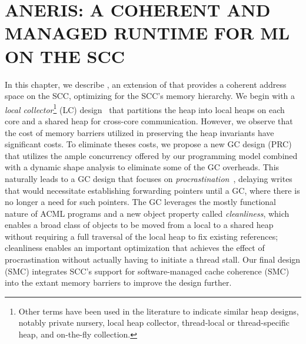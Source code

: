 \newcommand{\lc}{LC\xspace}
\newcommand{\prc}{PRC\xspace}
\newcommand{\smc}{SMC\xspace}
\newcommand{\kcore}{k_{core}}
\newcommand{\kmesh}{k_{mesh}}
\newcommand{\kram}{k_{ram}}

\lstset{
language=C,
numbers=left,
numberstyle=\footnotesize,
frame=single}




\chapter{ANERIS: A COHERENT AND MANAGED RUNTIME FOR ML ON THE SCC}
\label{chap:aneris}

In this chapter, we describe \MMSCC, an extension of \MM that provides a
coherent address space on the SCC, optimizing for the SCC's memory hierarchy.
We begin with a \emph{local collector}\footnote{Other terms have been used in
the literature to indicate similar heap designs, notably private nursery, local
heap collector, thread-local or thread-specific heap, and on-the-fly
collection.} (\lc) design~\cite{Steele75, Doligez93, Steensgaard00, Anderson10,
Marlow11, Auhagen11} that partitions the heap into local heaps on each core and
a shared heap for cross-core communication. However, we observe that the cost
of memory barriers utilized in preserving the heap invariants have significant
costs. To eliminate theses costs, we propose a new GC design (\prc) that
utilizes the ample concurrency offered by our programming model combined with a
dynamic shape analysis to eliminate some of the GC overheads. This naturally
leads to a GC design that focuses on \emph{procrastination}~\cite{mmgc},
delaying writes that would necessitate establishing forwarding pointers until a
GC, where there is no longer a need for such pointers. The GC leverages the
mostly functional nature of ACML programs and a new object property called
\emph{cleanliness}, which enables a broad class of objects to be moved from a
local to a shared heap without requiring a full traversal of the local heap to
fix existing references; cleanliness enables an important optimization that
achieves the effect of procrastination without actually having to initiate a
thread stall. Our final design (\smc) integrates SCC's support for
software-managed cache coherence (SMC)~\cite{SMC} into the extant memory
barriers to improve the design further.

